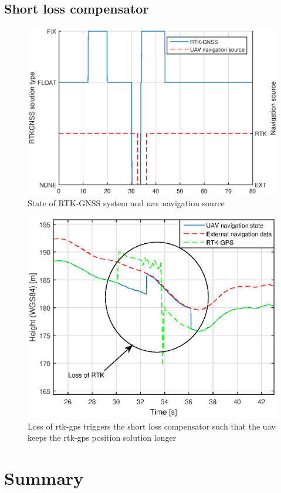 \subsection{Short loss compensator}
\begin{figure}
\centering
\includegraphics[scale=0.7]{figs/Experiment/navSource.eps}
\caption{State of RTK-GNSS system and \gls{uav} navigation source}
\label{Fig:NavSource}
\end{figure}
\begin{figure}[H]
\centering
\includegraphics[scale=0.7]{figs/Experiment/shortrtkloss1juni114124.eps}
\caption{Loss of \gls{rtk-gps} triggers the short loss compensator such that the \gls{uav} keeps the \gls{rtk-gps} position solution longer}
\label{Fig:ShortLoss}
\end{figure}
\section{Summary} 